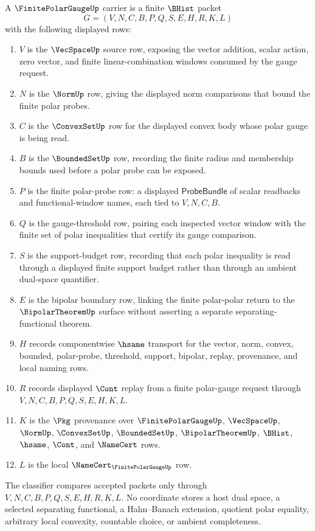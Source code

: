 \begin{definition}
\label{def:finite-polar-gauge-carrier}
A $\FinitePolarGaugeUp$ carrier is a finite $\BHist$ packet
$$
G=(V,N,C,B,P,Q,S,E,H,R,K,L)
$$
with the following displayed rows:
\begin{enumerate}
\item $V$ is the $\VecSpaceUp$ source row, exposing the vector addition, scalar action, zero vector, and finite linear-combination windows consumed by the gauge request.
\item $N$ is the $\NormUp$ row, giving the displayed norm comparisons that bound the finite polar probes.
\item $C$ is the $\ConvexSetUp$ row for the displayed convex body whose polar gauge is being read.
\item $B$ is the $\BoundedSetUp$ row, recording the finite radius and membership bounds used before a polar probe can be exposed.
\item $P$ is the finite polar-probe row: a displayed $\mathsf{ProbeBundle}$ of scalar readbacks and functional-window names, each tied to $V,N,C,B$.
\item $Q$ is the gauge-threshold row, pairing each inspected vector window with the finite set of polar inequalities that certify its gauge comparison.
\item $S$ is the support-budget row, recording that each polar inequality is read through a displayed finite support budget rather than through an ambient dual-space quantifier.
\item $E$ is the bipolar boundary row, linking the finite polar-polar return to the $\BipolarTheoremUp$ surface without asserting a separate separating-functional theorem.
\item $H$ records componentwise $\hsame$ transport for the vector, norm, convex, bounded, polar-probe, threshold, support, bipolar, replay, provenance, and local naming rows.
\item $R$ records displayed $\Cont$ replay from a finite polar-gauge request through $V,N,C,B,P,Q,S,E,H,K,L$.
\item $K$ is the $\Pkg$ provenance over $\FinitePolarGaugeUp$, $\VecSpaceUp$, $\NormUp$, $\ConvexSetUp$, $\BoundedSetUp$, $\BipolarTheoremUp$, $\BHist$, $\hsame$, $\Cont$, and $\NameCert$ rows.
\item $L$ is the local $\NameCert_{\FinitePolarGaugeUp}$ row.
\end{enumerate}
The classifier compares accepted packets only through $V,N,C,B,P,Q,S,E,H,R,K,L$. No coordinate stores a host dual space, a selected separating functional, a Hahn--Banach extension, quotient polar equality, arbitrary local convexity, countable choice, or ambient completeness.
\end{definition}

